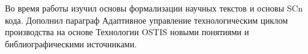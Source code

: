 
Во время работы изучил основы формализации научных текстов и основы SCn кода. Дополнил параграф Адаптивное управление технологическим циклом производства на основе Технологии OSTIS новыми понятиями и библиографическими источниками.